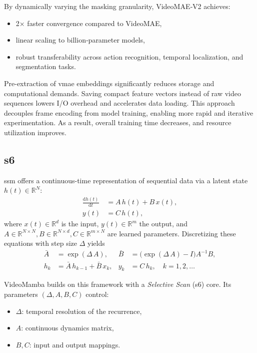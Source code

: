 By dynamically varying the masking granularity, VideoMAE‑V2 achieves:
\begin{itemize}
    \item 2× faster convergence compared to VideoMAE,
    \item linear scaling to billion‑parameter models,
    \item robust transferability across action recognition, temporal localization, and segmentation tasks\cite{wang_videomae_2023}.
\end{itemize}

Pre-extraction of \acrshort{vmae} embeddings significantly reduces storage and computational demands. Saving compact feature vectors instead of raw video sequences lowers I/O overhead and accelerates data loading. This approach decouples frame encoding from model training, enabling more rapid and iterative experimentation. As a result, overall training time decreases, and resource utilization improves.

\subsection{\acrfull{s6}}
\label{ssec:s6}

\acrfull{ssm} offers a continuous-time representation of sequential data via a latent state \(h(t)\in\mathbb{R}^N\):
\begin{align}
    \frac{\mathrm{d}h(t)}{\mathrm{d}t} &= A\,h(t) + B\,x(t),  \label{eq:ssm_continuous1}\\
    y(t) &= C\,h(t),                                    \label{eq:ssm_continuous2}
\end{align}
where \(x(t)\in\mathbb{R}^d\) is the input, \(y(t)\in\mathbb{R}^m\) the output, and \(A\in\mathbb{R}^{N\times N}, B\in\mathbb{R}^{N\times d}, C\in\mathbb{R}^{m\times N}\) are learned parameters.  Discretizing these equations with step size \(\Delta\) yields
\begin{align}
    \bar A &= \exp(\Delta\,A), 
    & 
    \bar B &= \bigl(\exp(\Delta\,A)-I\bigr)A^{-1}B,\\
    h_k &= \bar A\,h_{k-1} + \bar B\,x_k, 
    &
    y_k &= C\,h_k,
    \quad k=1,2,\dots
\end{align}

VideoMamba \cite{li_videomamba_2024} builds on this framework with a \emph{Selective Scan} (\acrshort{s6}) core. Its parameters \((\Delta, A,B,C)\) control:
\begin{itemize}
    \item \(\Delta\): temporal resolution of the recurrence,
    \item \(A\): continuous dynamics matrix,
    \item \(B,C\): input and output mappings.
\end{itemize}

